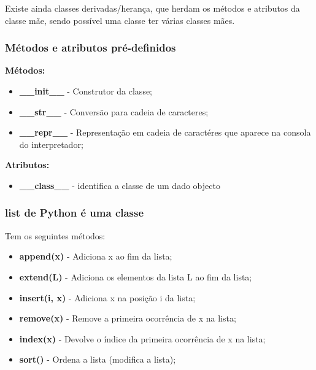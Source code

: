 \documentclass{article}
\begin{document}
Existe ainda classes derivadas/herança, que herdam os métodos e atributos da
classe mãe, sendo possível uma classe ter várias classes mães.

\pagebreak

\subsubsection{Métodos e atributos pré-definidos}

\begin{flushleft}
  \textbf{Métodos:}
  \begin{itemize}
    \item \textbf{\_\_init\_\_} - Construtor da classe;
    \item \textbf{\_\_str\_\_} - Conversão para cadeia de caracteres;
    \item \textbf{\_\_repr\_\_} - Representação em cadeia de caractéres
    que aparece na consola do interpretador;
  \end{itemize}

  \textbf{Atributos:}
  \begin{itemize}
    \item \textbf{\_\_class\_\_} - identifica a classe de um dado objecto
  \end{itemize}
\end{flushleft}

\subsubsection{list de Python é uma classe}

\begin{flushleft}
  Tem os seguintes métodos:
  \begin{itemize}
    \item \textbf{append(x)} - Adiciona x ao fim da lista;
    \item \textbf{extend(L)} - Adiciona os elementos da lista L ao fim da lista;
    \item \textbf{insert(i, x)} - Adiciona x na posição i da lista;
    \item \textbf{remove(x)} - Remove a primeira ocorrência de x na lista;
    \item \textbf{index(x)} - Devolve o índice da primeira ocorrência de x na lista;
    \item \textbf{sort()} - Ordena a lista (modifica a lista);
  \end{itemize}
\end{flushleft}
\end{document}
